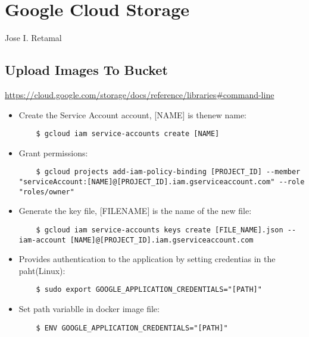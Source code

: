 \chapter{Google Cloud Storage}
Jose I. Retamal
\vskip 0.1in
\indent
\indent

\section{Upload Images To Bucket}

\url{https://cloud.google.com/storage/docs/reference/libraries#command-line}

\begin{itemize}
	\item Create the Service Account account, [NAME] is thenew name:
	
	\begin{verbatim}
	$ gcloud iam service-accounts create [NAME]
	\end{verbatim}
	
	\item Grant permissions:
	
	\begin{verbatim}
	$ gcloud projects add-iam-policy-binding [PROJECT_ID] --member "serviceAccount:[NAME]@[PROJECT_ID].iam.gserviceaccount.com" --role "roles/owner"
	\end{verbatim}
	
	\item Generate the key file, [FILENAME] is the name of the new file:
		
	\begin{verbatim}
	$ gcloud iam service-accounts keys create [FILE_NAME].json --iam-account [NAME]@[PROJECT_ID].iam.gserviceaccount.com
	\end{verbatim}
	
	
	\item Provides authentication to the application by setting credentias in the paht(Linux):
	
	\begin{verbatim}
	$ sudo export GOOGLE_APPLICATION_CREDENTIALS="[PATH]"
	\end{verbatim}
	
	\item Set path variablle in docker image file:
	
	\begin{verbatim}
	$ ENV GOOGLE_APPLICATION_CREDENTIALS="[PATH]"
	\end{verbatim}
	

\end{itemize}
